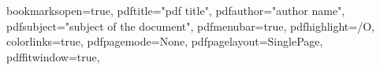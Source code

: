 




\graphicspath{{.}{resources/}}

\hypersetup
{
bookmarksopen=true,
pdftitle="pdf title",
pdfauthor="author name",
pdfsubject="subject of the document",
pdfmenubar=true,
pdfhighlight=/O,
colorlinks=true,
pdfpagemode=None,
pdfpagelayout=SinglePage,
pdffitwindow=true,
}








\frontmatter %



\dominitoc

\tableofcontents

\mainmatter %







\appendix %



\backmatter

\printbibliography[heading=bibintoc]

\listoffigures
{}

\listoftables
{}

